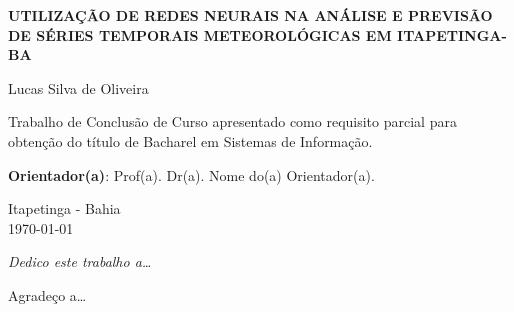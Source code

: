 \documentclass[12pt, openright, a4paper, brazil, oneside]{abntex2}
\begin{document}
    \begin{folhaderosto}

        \begin{center}
            \ABNTEXchapterfont\bfseries\LARGE UTILIZAÇÃO DE REDES NEURAIS NA ANÁLISE E PREVISÃO DE SÉRIES TEMPORAIS METEOROLÓGICAS EM ITAPETINGA-BA
        \end{center}

        \vspace{4cm}

        \begin{center}
            {\ABNTEXchapterfont\large Lucas Silva de Oliveira}
        \end{center}

        \vspace{4cm}

        \vspace*{\fill}
        \begin{flushright}
            \begin{minipage}{8.6cm}
                Trabalho de Conclusão de Curso apresentado como 
                requisito parcial para obtenção 
                do título de Bacharel em Sistemas de Informação.
                
                \vspace{0.5cm}
                \textbf{Orientador(a)}: Prof(a). Dr(a). Nome do(a) Orientador(a).
            \end{minipage}
        \end{flushright}

        \vspace{5.5cm}

        \begin{center}
            \large Itapetinga - Bahia\\
            \today
        \end{center}

    \end{folhaderosto}


    \begin{dedicatoria}
        \vspace*{\fill}
        \begin{flushright}
            \noindent
            \textit{Dedico este trabalho a\ldots}
        \end{flushright}
    \end{dedicatoria}

    \begin{agradecimentos}
        Agradeço a\ldots
    \end{agradecimentos}
\end{document}
